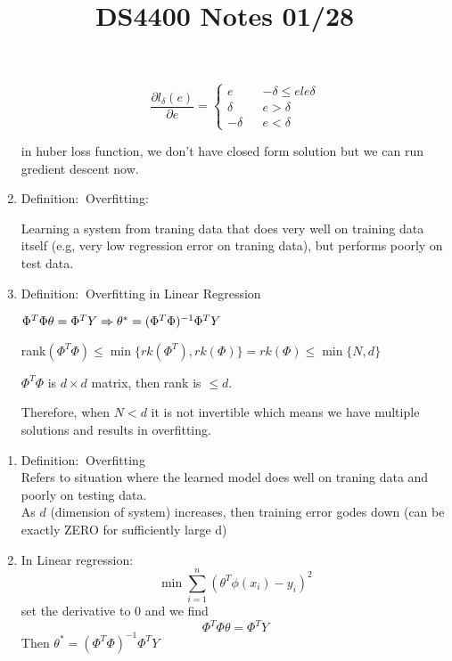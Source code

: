 \documentclass[12pt]{article}
\newcommand{\defi}{{\color{blue} Definition: $\ $}}
\begin{document}
\begin{multicols}{2}
\begin{enumerate}
             $$
             \frac{\partial l_{\delta}(e)}{\partial e} = 
             \left\{
                 \begin{array}{rcl}
                    e & & -\delta \le e le \delta\\
                    \delta & & e > \delta\\
                    -\delta & & e < \delta
                 \end{array}
             \right.
             $$

             in huber loss function, we don't have closed form solution but we can run gredient descent now.

             \item \defi Overfitting: 
             
             Learning a system from traning data that does very well on training data itself (e.g, very low regression error on traning data), but performs poorly on test data.

             \item \defi Overfitting in Linear Regression
             
             $\Phi^T \Phi \theta = \Phi^T Y \\ 
             \Rightarrow \theta^* = (\Phi^T \Phi)^{-1} \Phi^T Y$

             rank$(\Phi^T \Phi) \le \min \{rk(\Phi^T), rk(\Phi)\} = rk(\Phi) \le \min\{N,d\}$

             $\Phi^T\Phi$ is $d\times d$ matrix, then rank is $\le d$.

             Therefore, when $N < d$ it is not invertible which means we have multiple solutions and results in overfitting.
        \end{enumerate}
        \title{DS4400 Notes 01/28}
        \maketitle
        \begin{enumerate}
            \item \defi Overfitting\\
            Refers to situation where the learned model does well on traning data and poorly on testing data.\\
            As $d$ (dimension of system) increases, then training error godes down (can be exactly ZERO for sufficiently large d)

            \item In Linear regression:\\
            $$\min \sum_{i = 1}^n (\theta^T \phi(x_i) - y_i)^2$$ set the derivative to 0 and we find $$\Phi^T \Phi \theta = \Phi^T Y$$ Then $\theta^* = (\Phi^T \Phi)^{-1}\Phi^T Y$


\end{enumerate}
\end{multicols}
\end{document}
